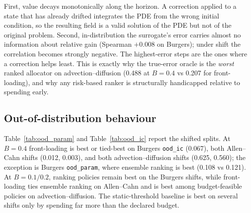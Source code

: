 \documentclass[11pt]{article}
\begin{document}
First, value decays monotonically along the horizon. A correction applied to a
state that has already drifted integrates the PDE from the wrong initial
condition, so the resulting field is a valid solution of the PDE but not of the
original problem. Second, in-distribution the surrogate's error carries almost
no information about relative gain (Spearman $+0.008$ on Burgers); under shift
the correlation becomes strongly negative. The highest-error steps are the ones
where a correction helps least. This is exactly why the true-error oracle is the
\emph{worst} ranked allocator on advection--diffusion (0.488 at $B=0.4$ vs 0.207
for front-loading), and why any risk-based ranker is structurally handicapped
relative to spending early.

\subsection{Out-of-distribution behaviour}
\label{sec:ood}

Table~\ref{tab:ood_param} and Table~\ref{tab:ood_ic} report the shifted splits.
At $B=0.4$ front-loading is best or tied-best on Burgers \texttt{ood\_ic}
(0.067), both Allen--Cahn shifts (0.012, 0.003), and both
advection--diffusion shifts (0.625, 0.560); the exception is Burgers
\texttt{ood\_param}, where ensemble ranking is best (0.108 vs 0.121). At
$B=0.1/0.2$, ranking policies remain best on the Burgers shifts, while
front-loading ties ensemble ranking on Allen--Cahn and is best among
budget-feasible policies on advection--diffusion. The static-threshold
baseline is best on several shifts only by spending far more than the declared
budget.

\begin{table}[t]
\centering
\footnotesize
\setlength{\tabcolsep}{4pt}

\caption{Parameter shift: relative $L_2$ error / realised cost. The `fixed'
threshold baseline is omitted because its realised cost is not the declared
budget (Table~\ref{tab:audit}); on several of these splits it reaches cost
$1.00$.}
\label{tab:ood_param}
\end{table}

\begin{table}[t]
\centering
\footnotesize
\setlength{\tabcolsep}{4pt}

\caption{Initial-condition shift: relative $L_2$ error / realised cost.}
\label{tab:ood_ic}
\end{table}
\end{document}
